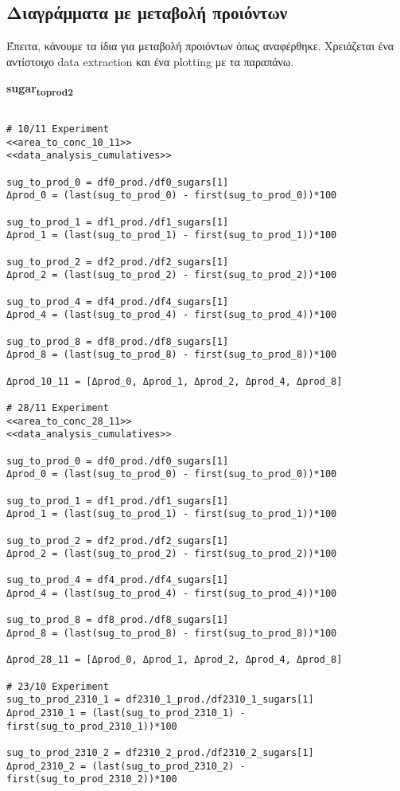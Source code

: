 \documentclass[11pt]{article}
\begin{document}
\subsection{Διαγράμματα με μεταβολή προιόντων}
\label{sec:orgf420f58}
Έπειτα, κάνουμε τα ίδια για μεταβολή προιόντων όπως αναφέρθηκε. Χρειάζεται ένα αντίστοιχο data extraction και ένα plotting με τα παραπάνω.

\textbf{sugar\textsubscript{to}\textsubscript{prod}\textsubscript{2}}
\begin{verbatim}

# 10/11 Experiment
<<area_to_conc_10_11>>
<<data_analysis_cumulatives>>

sug_to_prod_0 = df0_prod./df0_sugars[1]
Δprod_0 = (last(sug_to_prod_0) - first(sug_to_prod_0))*100

sug_to_prod_1 = df1_prod./df1_sugars[1]
Δprod_1 = (last(sug_to_prod_1) - first(sug_to_prod_1))*100

sug_to_prod_2 = df2_prod./df2_sugars[1]
Δprod_2 = (last(sug_to_prod_2) - first(sug_to_prod_2))*100

sug_to_prod_4 = df4_prod./df4_sugars[1]
Δprod_4 = (last(sug_to_prod_4) - first(sug_to_prod_4))*100

sug_to_prod_8 = df8_prod./df8_sugars[1]
Δprod_8 = (last(sug_to_prod_8) - first(sug_to_prod_8))*100

Δprod_10_11 = [Δprod_0, Δprod_1, Δprod_2, Δprod_4, Δprod_8]

# 28/11 Experiment
<<area_to_conc_28_11>>
<<data_analysis_cumulatives>>

sug_to_prod_0 = df0_prod./df0_sugars[1]
Δprod_0 = (last(sug_to_prod_0) - first(sug_to_prod_0))*100

sug_to_prod_1 = df1_prod./df1_sugars[1]
Δprod_1 = (last(sug_to_prod_1) - first(sug_to_prod_1))*100

sug_to_prod_2 = df2_prod./df2_sugars[1]
Δprod_2 = (last(sug_to_prod_2) - first(sug_to_prod_2))*100

sug_to_prod_4 = df4_prod./df4_sugars[1]
Δprod_4 = (last(sug_to_prod_4) - first(sug_to_prod_4))*100

sug_to_prod_8 = df8_prod./df8_sugars[1]
Δprod_8 = (last(sug_to_prod_8) - first(sug_to_prod_8))*100

Δprod_28_11 = [Δprod_0, Δprod_1, Δprod_2, Δprod_4, Δprod_8]

# 23/10 Experiment
sug_to_prod_2310_1 = df2310_1_prod./df2310_1_sugars[1]
Δprod_2310_1 = (last(sug_to_prod_2310_1) - first(sug_to_prod_2310_1))*100

sug_to_prod_2310_2 = df2310_2_prod./df2310_2_sugars[1]
Δprod_2310_2 = (last(sug_to_prod_2310_2) - first(sug_to_prod_2310_2))*100
\end{verbatim}
\end{document}

